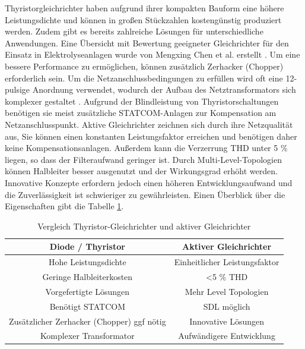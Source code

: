 Thyristorgleichrichter haben aufgrund ihrer kompakten Bauform eine höhere Leistungsdichte und können in großen Stückzahlen kostengünstig produziert werden. Zudem gibt es bereits zahlreiche Lösungen für unterschiedliche Anwendungen. Eine Übersicht mit Bewertung geeigneter Gleichrichter für den Einsatz in Elektrolyseanlagen wurde von Mengxing Chen et al. erstellt \cite{HydrogenElectronicTopologies}. Um eine bessere Performance zu ermöglichen, können zusätzlich Zerhacker (Chopper) erforderlich sein. Um die Netzanschlussbedingungen zu erfüllen wird oft eine 12-pulsige Anordnung verwendet, wodurch der Aufbau des Netztransformators sich komplexer gestaltet \cite{HydrogenRectInf}. Aufgrund der Blindleistung von Thyristorschaltungen benötigen sie meist zusätzliche STATCOM-Anlagen zur Kompensation am Netzanschlusspunkt. Aktive Gleichrichter zeichnen sich durch ihre Netzqualität aus, Sie können einen konstanten Leistungsfaktor erreichen und benötigen daher keine Kompensationsanlagen. Außerdem kann die Verzerrung \gls{THD} unter 5 \% liegen, so dass der Filteraufwand geringer ist. Durch Multi-Level-Topologien können Halbleiter besser ausgenutzt und der Wirkungsgrad erhöht werden. Innovative Konzepte erfordern jedoch einen höheren Entwicklungsaufwand und die Zuverlässigkeit ist schwieriger zu gewährleisten. Einen Überblick über die Eigenschaften gibt die Tabelle \ref{tab:thyVSafe}.\\
	\begin{table}
		\centering
		\caption{Vergleich Thyristor-Gleichrichter und aktiver Gleichrichter}
		\label{tab:thyVSafe}
		\begin{tabular}{|c|c|} 
			\hline
			\textbf{Diode / Thyristor} & \textbf{Aktiver Gleichrichter} \\
			\hline
			Hohe Leistungsdichte & Einheitlicher Leistungsfaktor \\
			\hline
			Geringe Halbleiterkosten & <5 \% \gls{THD} \\
			\hline
			Vorgefertigte Lösungen & Mehr Level Topologien  \\
			\hline
			Benötigt STATCOM &  \gls{SDL} möglich \\
			\hline
			Zusätzlicher Zerhacker (Chopper) ggf  nötig & Innovative Lösungen \\
			\hline
			Komplexer Transformator & Aufwändigere Entwicklung \\
			\hline
		\end{tabular}
	\end{table}
